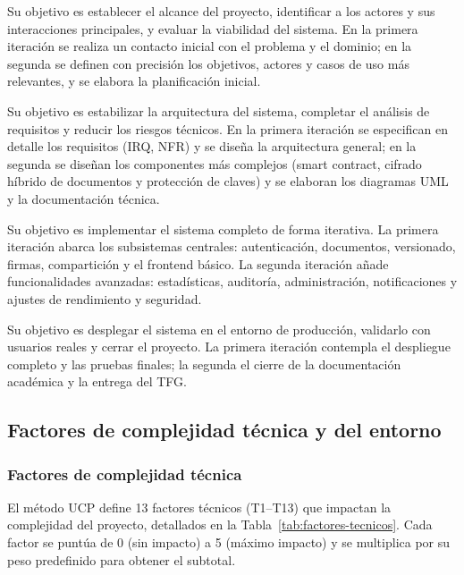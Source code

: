 \documentclass[11pt, a4paper]{article}
\begin{document}
\begin{description}[leftmargin=2cm, style=nextline]
    \item[\textbf{Inicio}] Su objetivo es establecer el alcance del proyecto, identificar a los actores y sus interacciones principales, y evaluar la viabilidad del sistema. En la primera iteración se realiza un contacto inicial con el problema y el dominio; en la segunda se definen con precisión los objetivos, actores y casos de uso más relevantes, y se elabora la planificación inicial.

    \item[\textbf{Elaboración}] Su objetivo es estabilizar la arquitectura del sistema, completar el análisis de requisitos y reducir los riesgos técnicos. En la primera iteración se especifican en detalle los requisitos (IRQ, NFR) y se diseña la arquitectura general; en la segunda se diseñan los componentes más complejos (smart contract, cifrado híbrido de documentos y protección de claves) y se elaboran los diagramas UML y la documentación técnica.

    \item[\textbf{Construcción}] Su objetivo es implementar el sistema completo de forma iterativa. La primera iteración abarca los subsistemas centrales: autenticación, documentos, versionado, firmas, compartición y el frontend básico. La segunda iteración añade funcionalidades avanzadas: estadísticas, auditoría, administración, notificaciones y ajustes de rendimiento y seguridad.

    \item[\textbf{Transición}] Su objetivo es desplegar el sistema en el entorno de producción, validarlo con usuarios reales y cerrar el proyecto. La primera iteración contempla el despliegue completo y las pruebas finales; la segunda el cierre de la documentación académica y la entrega del TFG.
\end{description}

\subsection{Factores de complejidad técnica y del entorno}

\subsubsection{Factores de complejidad técnica}

El método UCP define 13 factores técnicos (T1--T13) que impactan la complejidad del proyecto, detallados en la Tabla~\ref{tab:factores-tecnicos}. Cada factor se puntúa de 0 (sin impacto) a 5 (máximo impacto) y se multiplica por su peso predefinido para obtener el subtotal.
\end{document}
